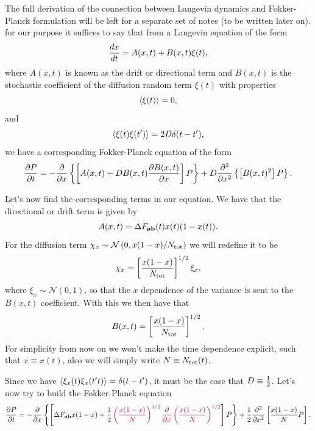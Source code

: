 The full derivation of the connection between Langevin dynamics and Fokker-
Planck formulation will be left for a separate set of notes \manuelComment(to
be written later on). for our purpose it suffices to say that from a Langevin
equation of the form
\begin{equation}
  {d{x} \over dt} = A(x, t) + B(x, t) \xi(t),
\end{equation}
where $A(x, t)$ is known as the drift or directional term and $B(x, t)$ is the
stochastic coefficient of the diffusion random term $\xi(t)$ with properties
\begin{equation}
  \left\langle \xi(t) \right\rangle = 0,
\end{equation}
and
\begin{equation}
  \left\langle \xi(t) \xi(t') \right\rangle = 2D \delta(t - t'),
\end{equation}
we have a corresponding Fokker-Planck equation of the form
\begin{equation}
  {\partial P \over \partial t} = - {\partial \over \partial x}
  \left\{ \left[ A(x, t) + D B(x, t) {\partial B(x, t) \over \partial x}
  \right] P \right\} +
  D {\partial^2 \over \partial x^2} \left\{ \left[ B(x, t)^2 \right] P \right\}.
\end{equation}

Let's now find the corresponding terms in our equation. We have that the
directional or drift term is given by
\begin{equation}
  A(x, t) = \Delta F_{\mathbf{ab}}(t) x(t) (1 - x(t)).
\end{equation}
For the diffusion term $\chi_x \sim \mathcal{N} \left( 0, x(1-x)/N_{\text{tot}} \right)$
we will redefine it to be
\begin{equation}
  \chi_x = \left[ {x (1 - x) \over N_{\text{tot}}} \right]^{1/2} \xi_x,
\end{equation}
where $\xi_x \sim \mathcal{N}(0, 1)$, so that the $x$ dependence of the variance
is sent to the $B(x, t)$ coefficient. With this we then have that
\begin{equation}
  B(x, t) = \left[ {x (1 - x) \over N_{\text{tot}}} \right]^{1/2}.
\end{equation}
For simplicity from now on we won't make the time dependence explicit, such that
$x \equiv x(t)$, also we will simply write $N \equiv N_{\text{tot}}(t)$.

Since we have $\left\langle \xi_x(t) \xi_x(t't) \right\rangle = \delta(t - t')$, it must be the
case that $D \equiv {1 \over 2}$. Let's now try to build the Fokker-Planck
equation
\begin{equation}
  {\partial P \over \partial t} = - {\partial \over \partial x}
  \left\{ \left[ \Delta F_{\mathbf{ab}} x (1 - x) +
  \textcolor{purple}{{1 \over 2} \left( {x (1 - x) \over N} \right)^{1/2}
  {\partial \over \partial x} \left( x (1 - x) \over N \right)^{1/2}}
  \right] P \right\} +
  {1 \over 2} {\partial^2 \over \partial x^2} \left[ {x (1 - x) \over N} P
  \right].
\end{equation}

